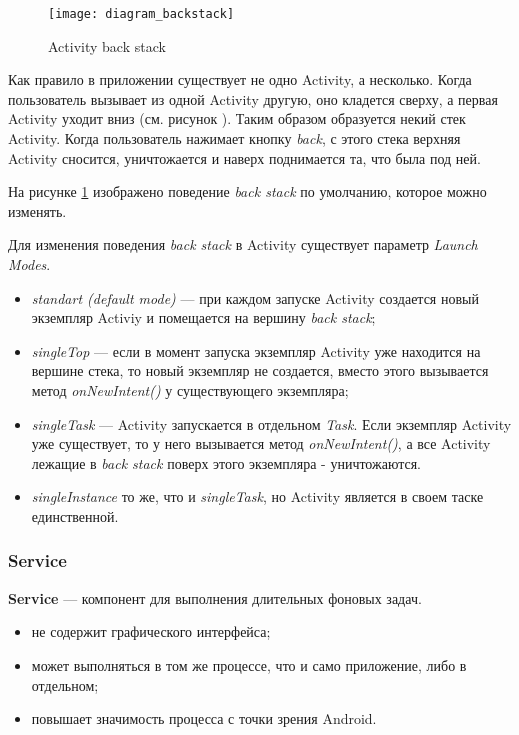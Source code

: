 \begin{figure}[H]
    \centering
    \texttt{[image: diagram\_backstack]}
    \caption{Activity back stack}
    \label{fig:diagram_backstack}
\end{figure}

Как правило в приложении существует не одно Activity, а несколько. Когда пользователь вызывает из одной Activity другую, оно кладется сверху, а первая Activity уходит вниз (см. рисунок ). Таким образом образуется некий стек Activity. Когда пользователь нажимает кнопку \textit{back}, с этого стека верхняя Activity сносится, уничтожается и наверх поднимается та, что была под ней.

На рисунке \ref{fig:diagram_backstack} изображено поведение \textit{back stack} по умолчанию, которое можно изменять.

Для изменения поведения \textit{back stack} в Activity существует параметр \textit{Launch Modes}.
\begin{itemize}
	\item \textit{standart (default mode)} --- при каждом запуске Activity создается новый экземпляр Activiy и помещается на вершину \textit{back stack};
	\item \textit{singleTop} --- если в момент запуска экземпляр Activity уже находится на вершине стека, то новый экземпляр не создается, вместо этого вызывается метод \textit{onNewIntent()} у существующего экземпляра;
	\item \textit{singleTask} --- Activity запускается в отдельном \textit{Task}. Если экземпляр Activity уже существует, то у него вызывается метод \textit{onNewIntent()}, а все Activity лежащие в \textit{back stack} поверх этого экземпляра - уничтожаются.
	\item \textit{singleInstance} то же, что и \textit{singleTask}, но Activity является в своем таске единственной.
\end{itemize}

\subsubsection{Service}
\textbf{Service} --- компонент для выполнения длительных фоновых задач.

\begin{itemize}
	\item не содержит графического интерфейса;
	\item может выполняться в том же процессе, что и само приложение, либо в отдельном;
	\item повышает значимость процесса с точки зрения Android.
\end{itemize}


